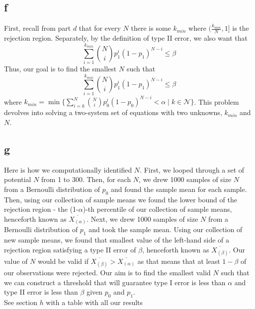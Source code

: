 \documentclass[12pt,notitlepage]{article}
\newcommand{\N}{\mathcal{N}}
\begin{document}
\subsection*{f}
First, recall from part $d$ that for every $N$ there is some $k_{min}$ where $(\frac{k_{min}}{N}, 1]$ is the rejection region. Separately, by the definition of type II error, we also want that 
$$\sum_{i=1}^{k_{min}} \binom{N}{i} p_1^i(1-p_1)^{N-i} \leq \beta$$
Thus, our goal is to find the smallest $N$ such that 
$$\sum_{i=1}^{k_{min}} \binom{N}{i} p_1^i(1-p_1)^{N-i} \leq \beta$$
where $k_{min} = \min\{\sum_{i=k}^N \binom{N}{i} p_0^i (1-p_0)^{N-i} < \alpha \mid k \in \N\}$. This problem devolves into solving a two-system set of equations with two unknowns, $k_{min}$ and $N$.
\subsection*{g}
Here is how we computationally identified $N$. First, we looped through a set of potential $N$ from 1 to 300. Then, for each $N$, we drew 1000 samples of size $N$ from a Bernoulli distribution of $p_0$ and found the sample mean for each sample. Then, using our collection of sample means we found the lower bound of the rejection region - the (1-$\alpha$)-th percentile of our collection of sample means, henceforth known as $\overline{X_{(\alpha)}}$. Next, we drew 1000 samples of size $N$ from a Bernoulli distribution of $p_1$ and took the sample mean. Using our collection of new sample means, we found that smallest value of the left-hand side of a rejection region satisfying a type II error of $\beta$, henceforth known as $\overline{X_{(\beta)}}$. Our value of $N$ would be valid if $\overline{X_{(\beta)}} > \overline{X_{(\alpha)}}$ as that means that at least $1-\beta$ of our observations were rejected. Our aim is to find the smallest valid $N$ such that we can construct a threshold that will guarantee type I error is less than $\alpha$ and type II error is less than $\beta$ given $p_0$ and $p_1$. \\
See section $h$ with a table with all our results
\newpage
\end{document}
